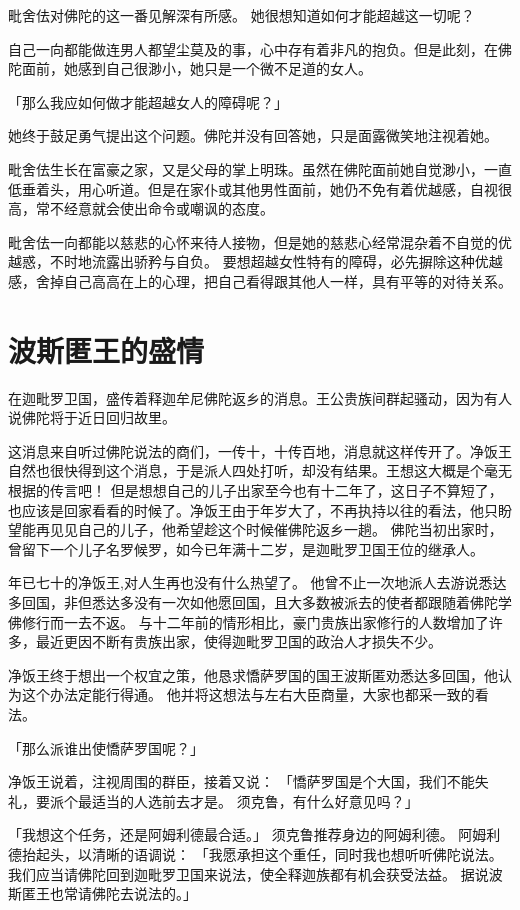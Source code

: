 \documentclass[twoside,openany]{book}
\begin{document}
毗舍佉对佛陀的这一番见解深有所感。
她很想知道如何才能超越这一切呢？

自己一向都能做连男人都望尘莫及的事，心中存有着非凡的抱负。但是此刻，在佛陀面前，她感到自己很渺小，她只是一个微不足道的女人。

「那么我应如何做才能超越女人的障碍呢？」

她终于鼓足勇气提出这个问题。佛陀并没有回答她，只是面露微笑地注视着她。

毗舍佉生长在富豪之家，又是父母的掌上明珠。虽然在佛陀面前她自觉渺小，一直低垂着头，用心听道。但是在家仆或其他男性面前，她仍不免有着优越感，自视很高，常不经意就会使出命令或嘲讽的态度。

毗舍佉一向都能以慈悲的心怀来待人接物，但是她的慈悲心经常混杂着不自觉的优越惑，不时地流露出骄矜与自负。
要想超越女性特有的障碍，必先摒除这种优越感，舍掉自己高高在上的心理，把自己看得跟其他人一样，具有平等的对待关系。

\section{波斯匿王的盛情}\label{sec7.3}

在迦毗罗卫国，盛传着释迦牟尼佛陀返乡的消息。王公贵族间群起骚动，因为有人说佛陀将于近日回归故里。

这消息来自听过佛陀说法的商们，一传十，十传百地，消息就这样传开了。净饭王自然也很快得到这个消息，于是派人四处打听，却没有结果。王想这大概是个毫无根据的传言吧！
但是想想自己的儿子出家至今也有十二年了，这日子不算短了，也应该是回家看看的时候了。净饭王由于年岁大了，不再执持以往的看法，他只盼望能再见见自己的儿子，他希望趁这个时候催佛陀返乡一趟。
佛陀当初出家时，曾留下一个儿子名罗候罗，如今已年满十二岁，是迦毗罗卫国王位的继承人。

年已七十的净饭王,对人生再也没有什么热望了。
他曾不止一次地派人去游说悉达多回国，非但悉达多没有一次如他愿回国，且大多数被派去的使者都跟随着佛陀学佛修行而一去不返。
与十二年前的情形相比，豪门贵族出家修行的人数增加了许多，最近更因不断有贵族出家，使得迦毗罗卫国的政治人才损失不少。

净饭王终于想出一个权宜之策，他恳求憍萨罗国的国王波斯匿劝悉达多回国，他认为这个办法定能行得通。
他并将这想法与左右大臣商量，大家也都采一致的看法。

「那么派谁出使憍萨罗国呢？」

净饭王说着，注视周围的群臣，接着又说：
「憍萨罗国是个大国，我们不能失礼，要派个最适当的人选前去才是。
须克鲁，有什么好意见吗？」

「我想这个任务，还是阿姆利德最合适。」
须克鲁推荐身边的阿姆利德。
阿姆利德抬起头，以清晰的语调说：
「我愿承担这个重任，同时我也想听听佛陀说法。
我们应当请佛陀回到迦毗罗卫国来说法，使全释迦族都有机会获受法益。
据说波斯匿王也常请佛陀去说法的。」
\end{document}
